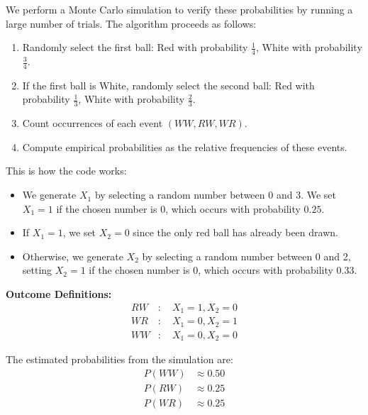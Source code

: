 \documentclass[journal]{IEEEtran}
\begin{document}
We perform a Monte Carlo simulation to verify these probabilities by running a large number of trials. The algorithm proceeds as follows:
\begin{enumerate}
    \item Randomly select the first ball: Red with probability $\frac{1}{4}$, White with probability $\frac{3}{4}$.
    \item If the first ball is White, randomly select the second ball: Red with probability $\frac{1}{3}$, White with probability $\frac{2}{3}$.
    \item Count occurrences of each event $(WW, RW, WR)$.
    \item Compute empirical probabilities as the relative frequencies of these events.
\end{enumerate}
This is how the code works:
\begin{itemize}
    \item We generate $X_1$ by selecting a random number between 0 and 3. We set $X_1 = 1$ if the chosen number is 0, which occurs with probability $0.25$.
    \item If $X_1 = 1$, we set $X_2 = 0$ since the only red ball has already been drawn.
    \item Otherwise, we generate $X_2$ by selecting a random number between 0 and 2, setting $X_2 = 1$ if the chosen number is 0, which occurs with probability $0.33$.
\end{itemize}

\textbf{Outcome Definitions:}
\begin{align*}
    RW &: \quad X_1 = 1, X_2 = 0 \\
    WR &: \quad X_1 = 0, X_2 = 1 \\
    WW &: \quad X_1 = 0, X_2 = 0
\end{align*}


The estimated probabilities from the simulation are:
\begin{align}
  P(WW) &\approx 0.50 \\
  P(RW) &\approx 0.25 \\
  P(WR) &\approx 0.25
\end{align}
\end{document}
